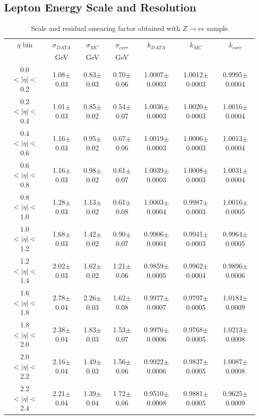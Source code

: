 \subsection{Lepton Energy Scale and Resolution}



\begin{table}[htb]
  \begin{center}
    \begin{tabular}{ccccccc}
$\eta$ bin & $\sigma_{DATA}$ &  $\sigma_{MC}$ & $\sigma_{corr}$ & $k_{DATA}$ &  $k_{MC}$ & $k_{corr}$ \\
&GeV &GeV &GeV & & & \\
\hline
0.0$<|\eta|<$0.2 &1.08$\pm$ 0.03 & 0.83$\pm$ 0.03 & 0.70$\pm$ 0.06 & 1.0007$\pm$ 0.0003 & 1.0012$\pm$ 0.0003 & 0.9995$\pm$ 0.0004 \\ 
0.2$<|\eta|<$0.4 &1.01$\pm$ 0.03 & 0.85$\pm$ 0.02 & 0.54$\pm$ 0.07 & 1.0036$\pm$ 0.0003 & 1.0020$\pm$ 0.0003 & 1.0016$\pm$ 0.0004 \\ 
0.4$<|\eta|<$0.6 &1.16$\pm$ 0.03 & 0.95$\pm$ 0.02 & 0.67$\pm$ 0.06 & 1.0019$\pm$ 0.0003 & 1.0006$\pm$ 0.0003 & 1.0013$\pm$ 0.0004 \\ 
0.6$<|\eta|<$0.8 &1.16$\pm$ 0.03 & 0.98$\pm$ 0.02 & 0.61$\pm$ 0.07 & 1.0039$\pm$ 0.0003 & 1.0008$\pm$ 0.0003 & 1.0031$\pm$ 0.0004 \\ 
0.8$<|\eta|<$1.0 &1.28$\pm$ 0.03 & 1.13$\pm$ 0.02 & 0.61$\pm$ 0.08 & 1.0003$\pm$ 0.0004 & 0.9987$\pm$ 0.0003 & 1.0016$\pm$ 0.0005 \\ 
1.0$<|\eta|<$1.2 &1.68$\pm$ 0.03 & 1.42$\pm$ 0.02 & 0.90$\pm$ 0.07 & 0.9906$\pm$ 0.0004 & 0.9941$\pm$ 0.0003 & 0.9964$\pm$ 0.0005 \\ 
1.2$<|\eta|<$1.4 &2.02$\pm$ 0.03 & 1.62$\pm$ 0.02 & 1.21$\pm$ 0.06 & 0.9859$\pm$ 0.0005 & 0.9962$\pm$ 0.0004 & 0.9896$\pm$ 0.0006 \\ 
1.6$<|\eta|<$1.8 &2.78$\pm$ 0.04 & 2.26$\pm$ 0.03 & 1.62$\pm$ 0.08 & 0.9977$\pm$ 0.0007 & 0.9797$\pm$ 0.0005 & 1.0184$\pm$ 0.0009 \\ 
1.8$<|\eta|<$2.0 &2.38$\pm$ 0.04 & 1.83$\pm$ 0.03 & 1.53$\pm$ 0.07 & 0.9976$\pm$ 0.0006 & 0.9768$\pm$ 0.0005 & 1.0213$\pm$ 0.0008 \\ 
2.0$<|\eta|<$2.2 &2.16$\pm$ 0.04 & 1.49$\pm$ 0.03 & 1.56$\pm$ 0.06 & 0.9922$\pm$ 0.0006 & 0.9837$\pm$ 0.0005 & 1.0087$\pm$ 0.0008 \\ 
2.2$<|\eta|<$2.4 &2.21$\pm$ 0.04 & 1.39$\pm$ 0.04 & 1.72$\pm$ 0.06 & 0.9510$\pm$ 0.0008 & 0.9881$\pm$ 0.0005 & 0.9625$\pm$ 0.0009 \\ 

    \end{tabular}
    \caption{\label{tab:ResCorr}Scale and residual smearing factor obtained with $Z\rightarrow ee$ sample}
  \end{center}
\end{table}

